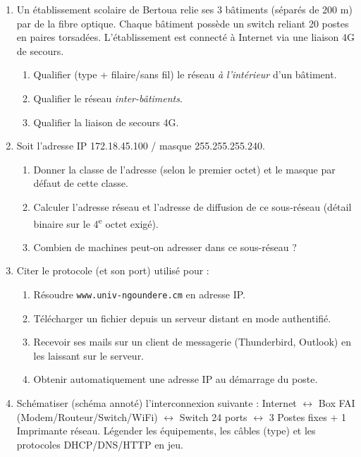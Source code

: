 \documentclass[11pt]{article}
\begin{document}
\begin{exercice}
\begin{enumerate}
\item Un établissement scolaire de Bertoua relie ses 3 bâtiments (séparés de 200 m) par de la fibre optique. Chaque bâtiment possède un switch reliant 20 postes en paires torsadées. L'établissement est connecté à Internet via une liaison 4G de secours.
\begin{enumerate}
\item Qualifier (type + filaire/sans fil) le réseau \emph{à l'intérieur} d'un bâtiment.
\item Qualifier le réseau \emph{inter-bâtiments}.
\item Qualifier la liaison de secours 4G.
\end{enumerate}
\item Soit l'adresse IP 172.18.45.100 / masque 255.255.255.240.
\begin{enumerate}
\item Donner la classe de l'adresse (selon le premier octet) et le masque par défaut de cette classe.
\item Calculer l'adresse réseau et l'adresse de diffusion de ce sous-réseau (détail binaire sur le 4\textsuperscript{e} octet exigé).
\item Combien de machines peut-on adresser dans ce sous-réseau ?
\end{enumerate}
\item Citer le protocole (et son port) utilisé pour :
\begin{enumerate}
\item Résoudre \texttt{www.univ-ngoundere.cm} en adresse IP.
\item Télécharger un fichier depuis un serveur distant en mode authentifié.
\item Recevoir ses mails sur un client de messagerie (Thunderbird, Outlook) en les laissant sur le serveur.
\item Obtenir automatiquement une adresse IP au démarrage du poste.
\end{enumerate}
\item Schématiser (schéma annoté) l'interconnexion suivante : Internet $\leftrightarrow$ Box FAI (Modem/Routeur/Switch/WiFi) $\leftrightarrow$ Switch 24 ports $\leftrightarrow$ 3 Postes fixes + 1 Imprimante réseau. Légender les équipements, les câbles (type) et les protocoles DHCP/DNS/HTTP en jeu.
\end{enumerate}
\end{exercice}
\end{document}
